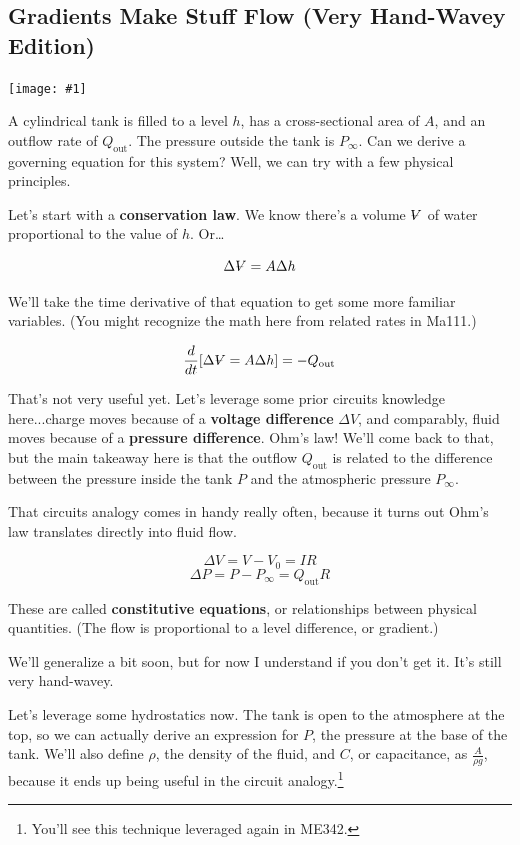 \documentclass{article}
\newcommand{\Volume}{{\ooalign{\hfil$V$\hfil\cr\kern0.08em--\hfil\cr}}}
\newcommand{\bicture}[1]{
\begin{center}
    {\texttt{[image: \#1]}}
\end{center}}
\begin{document}
\begin{onehalfspacing}
\begin{flushleft}
\subsection{Gradients Make Stuff Flow (Very Hand-Wavey Edition)}

\bicture{1_sys1}

A cylindrical tank is filled to a level \(h\), has a cross-sectional area of \(A\), and an outflow rate of \(Q_\text{out}\). The pressure outside the tank is \(P_{\infty}\). Can we derive a governing equation for this system? Well, we can try with a few physical principles.

\medskip

Let's start with a \textbf{conservation law}. We know there's a volume \(\Volume\) of water proportional to the value of \(h\). Or\dots

\vspace{-0.1in}
\[\Delta \Volume = A \Delta h\]

We'll take the time derivative of that equation to get some more familiar variables. (You might recognize the math here from related rates in Ma111.)

\[\frac{d}{dt} \qty[\Delta \Volume = A \Delta h] = -Q_\text{out}\]

That's not very useful yet. Let's leverage some prior circuits knowledge here...charge moves because of a \textbf{voltage difference} \(\Delta V\), and comparably, fluid moves because of a \textbf{pressure difference}. Ohm's law! We'll come back to that, but the main takeaway here is that the outflow \(Q_\text{out}\) is related to the difference between the pressure inside the tank \(P\) and the atmospheric pressure \(P_\infty\).

\medskip

That circuits analogy comes in handy really often, because it turns out Ohm's law translates directly into fluid flow. 

\[\Delta V = V - V_0 = IR\]
\[\Delta P = P-P_\infty = Q_\text{out} R\]

These are called \textbf{constitutive equations}, or relationships between physical quantities. (The flow is proportional to a level difference, or gradient.)

\medskip

We'll generalize a bit soon, but for now I understand if you don't get it. It's still very hand-wavey.

\medskip

Let's leverage some hydrostatics now. The tank is open to the atmosphere at the top, so we can actually derive an expression for \(P\), the pressure at the base of the tank. We'll also define \(\rho\), the density of the fluid, and \(C\), or capacitance, as \(\frac{A}{\rho g}\), because it ends up being useful in the circuit analogy.\footnote{You'll see this technique leveraged again in ME342.}


\end{flushleft}
\end{onehalfspacing}
\end{document}
